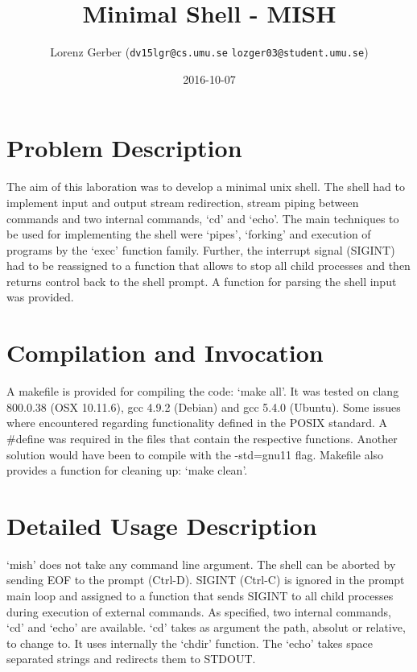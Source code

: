 \documentclass[a4paper,11pt,twoside]{article}
\title{Minimal Shell - MISH}
\author{Lorenz Gerber ({\tt{dv15lgr@cs.umu.se}} {\tt{lozger03@student.umu.se}})}
\date{2016-10-07}
\begin{document}
\lstset{language=C}
\maketitle
\thispagestyle{empty}
\newpage
\tableofcontents
\thispagestyle{empty}
\newpage

\clearpage
{}

\section{Problem Description} 
The aim of this laboration was to develop a minimal unix shell. The shell had to implement input and output stream redirection, stream piping between commands and two internal commands, `cd' and `echo'. The main techniques to be used for implementing the shell were `pipes', `forking' and execution of programs by the `exec' function family. Further, the interrupt signal (SIGINT) had to be reassigned to a function that allows to stop all child processes and then returns control back to the shell prompt. A function for parsing the shell input was provided. 

\section{Compilation and Invocation}
A makefile is provided for compiling the code: `make all'. It was tested on clang 800.0.38 (OSX 10.11.6), gcc 4.9.2 (Debian) and gcc 5.4.0 (Ubuntu). Some issues where encountered regarding functionality defined in the POSIX standard. A \#define was required in the files that contain the respective functions. Another solution would have been to compile with the -std=gnu11 flag. Makefile also provides a function for cleaning up: `make clean'.

\section{Detailed Usage Description}
`mish' does not take any command line argument. The shell can be aborted by sending EOF to the prompt (Ctrl-D). SIGINT (Ctrl-C) is ignored in the prompt main loop and assigned to a function that sends SIGINT to all child processes during execution of external commands.
As specified, two internal commands, `cd' and `echo' are available. `cd' takes as argument the path, absolut or relative,  to change to. It uses internally the `chdir' function. The `echo' takes space separated strings and redirects them to STDOUT.
\end{document}
